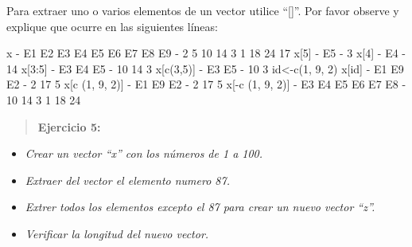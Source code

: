 \documentclass[
]{book}
\newenvironment{Shaded}{\begin{snugshade}}{\end{snugshade}}
\newcommand{\DecValTok}[1]{\textcolor[rgb]{0.00,0.00,0.81}{#1}}
\newcommand{\FunctionTok}[1]{\textcolor[rgb]{0.00,0.00,0.00}{#1}}
\newcommand{\NormalTok}[1]{#1}
\newcommand{\OtherTok}[1]{\textcolor[rgb]{0.56,0.35,0.01}{#1}}
\newcommand{\SpecialCharTok}[1]{\textcolor[rgb]{0.00,0.00,0.00}{#1}}
\begin{document}
Para extraer uno o varios elementos de un vector utilice ``{[}{]}''. Por favor observe y explique que ocurre en las siguientes líneas:

\begin{Shaded}
\begin{Highlighting}[]
\NormalTok{x}
\SpecialCharTok{{-}}\NormalTok{ E1 E2 E3 E4 E5 E6 E7 E8 E9 }
\SpecialCharTok{{-}}  \DecValTok{2}  \DecValTok{5} \DecValTok{10} \DecValTok{14}  \DecValTok{3}  \DecValTok{1} \DecValTok{18} \DecValTok{24} \DecValTok{17}
\NormalTok{x[}\DecValTok{5}\NormalTok{]}
\SpecialCharTok{{-}}\NormalTok{ E5 }
\SpecialCharTok{{-}}  \DecValTok{3}
\NormalTok{x[}\DecValTok{4}\NormalTok{]}
\SpecialCharTok{{-}}\NormalTok{ E4 }
\SpecialCharTok{{-}} \DecValTok{14}
\NormalTok{x[}\DecValTok{3}\SpecialCharTok{:}\DecValTok{5}\NormalTok{]}
\SpecialCharTok{{-}}\NormalTok{ E3 E4 E5 }
\SpecialCharTok{{-}} \DecValTok{10} \DecValTok{14}  \DecValTok{3}
\NormalTok{x[}\FunctionTok{c}\NormalTok{(}\DecValTok{3}\NormalTok{,}\DecValTok{5}\NormalTok{)]}
\SpecialCharTok{{-}}\NormalTok{ E3 E5 }
\SpecialCharTok{{-}} \DecValTok{10}  \DecValTok{3}
\NormalTok{id}\OtherTok{\textless{}{-}}\FunctionTok{c}\NormalTok{(}\DecValTok{1}\NormalTok{, }\DecValTok{9}\NormalTok{, }\DecValTok{2}\NormalTok{)}
\NormalTok{x[id]}
\SpecialCharTok{{-}}\NormalTok{ E1 E9 E2 }
\SpecialCharTok{{-}}  \DecValTok{2} \DecValTok{17}  \DecValTok{5}
\NormalTok{x[}\FunctionTok{c}\NormalTok{ (}\DecValTok{1}\NormalTok{, }\DecValTok{9}\NormalTok{, }\DecValTok{2}\NormalTok{)]}
\SpecialCharTok{{-}}\NormalTok{ E1 E9 E2 }
\SpecialCharTok{{-}}  \DecValTok{2} \DecValTok{17}  \DecValTok{5}
\NormalTok{x[}\SpecialCharTok{{-}}\FunctionTok{c}\NormalTok{ (}\DecValTok{1}\NormalTok{, }\DecValTok{9}\NormalTok{, }\DecValTok{2}\NormalTok{)]}
\SpecialCharTok{{-}}\NormalTok{ E3 E4 E5 E6 E7 E8 }
\SpecialCharTok{{-}} \DecValTok{10} \DecValTok{14}  \DecValTok{3}  \DecValTok{1} \DecValTok{18} \DecValTok{24}
\end{Highlighting}
\end{Shaded}

\begin{quote}
\textbf{Ejercicio 5:}
\end{quote}

\begin{itemize}
\item
  \emph{Crear un vector ``x'' con los números de 1 a 100.}
\item
  \emph{Extraer del vector el elemento numero 87.}
\item
  \emph{Extrer todos los elementos excepto el 87 para crear un nuevo vector ``z''.}
\item
  \emph{Verificar la longitud del nuevo vector.}
\end{itemize}
\end{document}
